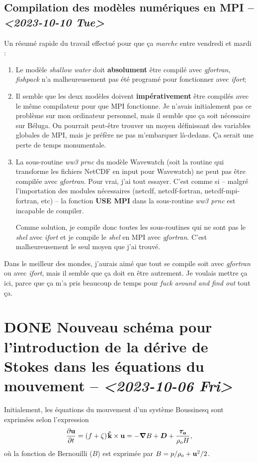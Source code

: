 \documentclass[10pt]{article}
\numberwithin{equation}{section}
\newcommand{\kvf}{\vb{\hat{k}}}
\newcommand{\uu}{\vb{u}}
\newcommand{\pt}{\hspace{1pt}} %
\begin{document}
\subsection{Compilation des modèles numériques en MPI -- \textit{<2023-10-10 Tue>}}
\label{sec:orga049dae}
Un résumé rapide du travail effectué pour que ça \emph{marche} entre vendredi et mardi : \bigskip
\begin{enumerate}
\item Le modèle \emph{shallow water} doit \textbf{absolument} être compilé avec \emph{gfortran}, \emph{fishpack} n'a malheureusement pas été programé pour fonctionner avec \emph{ifort};\bigskip
\item Il semble que les deux modèles doivent \textbf{impérativement} être compilés avec le même compilateur pour que MPI fonctionne.
Je n'avais initialement pas ce problème sur mon ordinateur personnel, mais il semble que ça soit nécessaire sur Béluga.
On pourrait peut-être trouver un moyen définissant des variables globales de MPI, mais je préfère ne pas m'embarquer là-dedans. Ça serait une perte de temps monumentale.\bigskip
\item La sous-routine \emph{ww3 prnc} du modèle Wavewatch (soit la routine qui transforme les fichiers NetCDF en input pour Wavewatch) ne peut pas être compilée avec \emph{gfortran}. Pour vrai, j'ai tout essayer.
C'est comme si -- malgré l'importation des modules nécessaires (netcdf, netcdf-fortran, netcdf-mpi-fortran, etc) -- la fonction \textbf{USE MPI} dans la sous-routine \emph{ww3 prnc} est incapable de compiler.\bigskip

Comme solution, je compile donc toutes les sous-routines qui ne sont pas le \emph{shel} avec \emph{ifort} et je compile le \emph{shel} en MPI avec \emph{gfortran}.
C'est malheureusement le seul moyen que j'ai trouvé.\bigskip
\end{enumerate}

Dans le meilleur des mondes, j'aurais aimé que tout se compile soit avec \emph{gfortran} ou avec \emph{ifort}, mais il semble que ça doit en être autrement.
Je voulais mettre ça ici, parce que ça m'a pris beaucoup de temps pour \emph{fuck around and find out} tout ça.
\section{{\bfseries\sffamily DONE} Nouveau schéma pour l'introduction de la dérive de Stokes dans les équations du mouvement -- \textit{<2023-10-06 Fri>}}
\label{sec:orgb929266}
Initialement, les équations du mouvement d'un système Boussinesq sont exprimées selon l'expression
\begin{equation}
\label{eq:org76d371e}
   \pdv{\uu}{t} = \qty(f+\zeta)\pt \kvf\times\uu = -\gradient{B} + \boldsymbol{D} + \frac{\boldsymbol{\tau_a}}{\rho_o H},
\end{equation}
où la fonction de Bernouilli (\(B\)) est exprimée par \(B = p/\rho_o + \uu^2/2\).\bigskip
\end{document}
